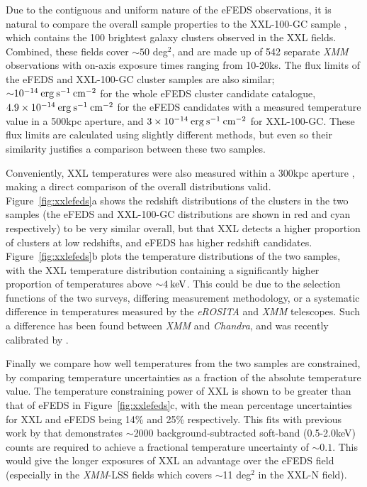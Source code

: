 \documentclass[fleqn,usenatbib]{mnras}
\begin{document}
Due to the contiguous and uniform nature of the eFEDS observations, it is natural to compare the overall sample properties to the XXL-100-GC sample \citep{xxlgc100}, which contains the 100 brightest galaxy clusters observed in the XXL \citep{xxlfoundation} fields. Combined, these fields cover ${\sim}50$ deg$^2$, and are made up of 542 separate {\em XMM} observations with on-axis exposure times ranging from 10-20ks. The flux limits of the eFEDS and XXL-100-GC cluster samples are also similar; ${\sim}10^{-14}\:\rm{erg}\:\rm{s}^{-1}\:\rm{cm}^{-2}$ for the whole eFEDS cluster candidate catalogue, $4.9\times10^{-14}\:\rm{erg}\:\rm{s}^{-1}\:\rm{cm}^{-2}$ for the eFEDS candidates with a measured temperature value in a 500kpc aperture, and $3\times10^{-14}\:\rm{erg}\:\rm{s}^{-1}\:\rm{cm}^{-2}$ for XXL-100-GC. These flux limits are calculated using slightly different methods, but even so their similarity justifies a comparison between these two samples.

Conveniently, XXL temperatures were also measured within a 300kpc aperture \citep{xxllt}, making a direct comparison of the overall distributions valid. Figure~\ref{fig:xxlefeds}a shows the redshift distributions of the clusters in the two samples (the eFEDS and XXL-100-GC distributions are shown in red and cyan respectively) to be very similar overall, but that XXL detects a higher proportion of clusters at low redshifts, and eFEDS has higher redshift candidates. Figure~\ref{fig:xxlefeds}b plots the temperature distributions of the two samples, with the XXL temperature distribution containing a significantly higher proportion of temperatures above ${\sim}4\:\rm{keV}$. This could be due to the selection functions of the two surveys, differing measurement methodology, or a systematic difference in temperatures measured by the {\em eROSITA} and {\em XMM} telescopes. Such a difference has been found between {\em XMM} and {\em Chandra}, and was recently calibrated by \cite{xmmchandracal}.

Finally we compare how well temperatures from the two samples are constrained, by comparing temperature uncertainties as a fraction of the absolute temperature value.  The temperature constraining power of XXL is shown to be greater than that of eFEDS in Figure~\ref{fig:xxlefeds}c, with the mean percentage uncertainties for XXL and eFEDS being 14\% and 25\% respectively. This fits with previous work by \cite{xcsmethod} that demonstrates ${\sim}2000$ background-subtracted soft-band (0.5-2.0keV) counts are required to achieve a fractional temperature uncertainty of ${\sim}0.1$. This would give the longer exposures of XXL an advantage over the eFEDS field (especially in the {\em XMM}-LSS fields which covers ${\sim}$11 deg$^{2}$ in the XXL-N field).
\end{document}
